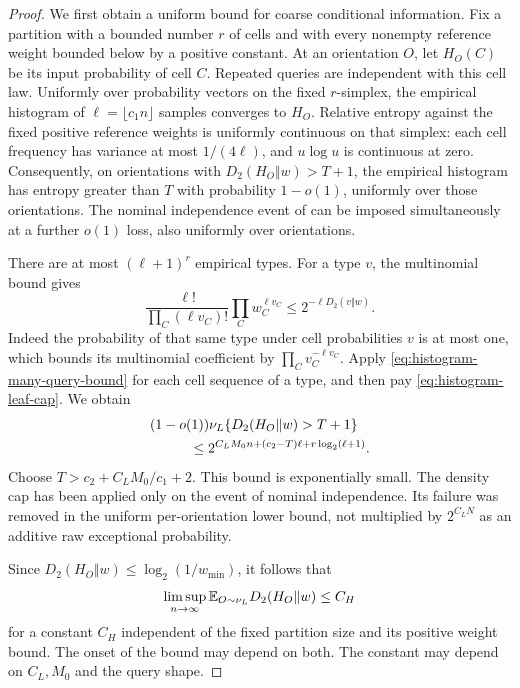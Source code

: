 \begin{proof}
We first obtain a uniform bound for coarse conditional information.
Fix a partition with a bounded number $r$ of cells and with every
nonempty reference weight bounded below by a positive constant. At an
orientation $O$, let $H_O(C)$ be its input probability of cell $C$.
Repeated queries are independent with this cell law. Uniformly over
probability vectors on the fixed $r$-simplex, the empirical histogram of
$\ell=\lfloor c_1n\rfloor$ samples converges to $H_O$. Relative entropy
against the fixed positive reference weights is uniformly continuous
on that simplex: each cell frequency has variance at most $1/(4\ell)$,
and $u\log u$ is continuous at zero. Consequently, on orientations with
$D_2(H_O\Vert w)>T+1$, the empirical histogram has entropy greater
than $T$ with probability $1-o(1)$, uniformly over those orientations.
The nominal independence event of
 can be imposed simultaneously at a
further $o(1)$ loss, also uniformly over orientations.

There are at most $(\ell+1)^r$ empirical types. For a type $v$, the
multinomial bound gives
\[
 \frac{\ell!}{\prod_C(\ell v_C)!}\prod_Cw_C^{\ell v_C}
 \le 2^{-\ell D_2(v\Vert w)}.
\]
Indeed the probability of that same type under cell probabilities $v$
is at most one, which bounds its multinomial coefficient by
$\prod_Cv_C^{-\ell v_C}$.
Apply \eqref{eq:histogram-many-query-bound} for each cell sequence of a
type, and then pay \eqref{eq:histogram-leaf-cap}. We obtain
\begin{align}\label{eq:histogram-entropy-tail}
 &(1-o(1))\nu_L\{D_2(H_O\Vert w)>T+1\}\notag\\
 &\hspace{1cm}\le
 2^{C_LM_0n+(c_2-T)\ell+r\log_2(\ell+1)}.
\end{align}
Choose $T>c_2+C_LM_0/c_1+2$. This bound is exponentially small.
The density cap has been applied only on the event of
nominal independence. Its failure was removed in the uniform
per-orientation lower bound, not multiplied by $2^{C_LN}$ as an
additive raw exceptional probability.

Since $D_2(H_O\Vert w)\le\log_2(1/w_{\min})$, it follows that
\begin{equation}\label{eq:histogram-coarse-entropy}
 \limsup_{n\to\infty}\mathbb E_{O\sim\nu_L}D_2(H_O\Vert w)\le C_H
\end{equation}
for a constant $C_H$ independent of the fixed partition size and its
positive weight bound. The onset of the bound may depend on both.
The constant may depend on $C_L,M_0$ and the query shape.


\end{proof}
